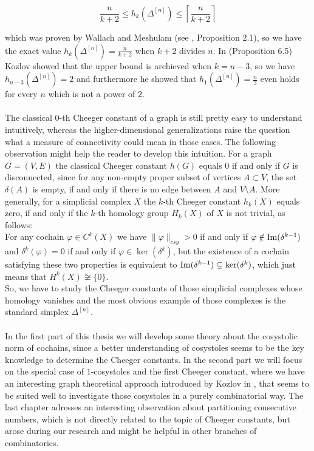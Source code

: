 \begin{equation}\label{equation1}
\frac{n}{k+2}\leq h_k(\Delta^{[n]})\leq\left\lceil\frac{n}{k+2}\right\rceil
\end{equation}

which was proven by Wallach and Meshulam (see \cite{4}, Proposition 2.1), so we have the exact value \(h_k(\Delta^{[n]})=\frac{n}{k+2}\) when \(k+2\) divides \(n\). In \cite{1} (Proposition 6.5) Kozlov showed that the upper bound is archieved when \(k=n-3\), so we have \(h_{n-3}(\Delta^{[n]})=2\) and furthermore he showed that \(h_1(\Delta^{[n]})=\frac{n}{3}\) even holds for every \(n\) which is not a power of \(2\).\\
\\
The classical \(0\)-th Cheeger constant of a graph is still pretty easy to understand intuitively, whereas the higher-dimensional generalizations raise the question what a measure of connectivity could mean in those cases. The following observation might help the reader to develop this intuition. For a graph \(G=(V,E)\) the classical Cheeger constant \(h(G)\) equals \(0\) if and only if \(G\) is disconnected, since for any non-empty proper subset of vertices \(A\subset V\), the set \(\delta(A)\) is empty, if and only if there is no edge between \(A\) and \(V\setminus A\). More generally, for a simplicial complex \(X\) the \(k\)-th Cheeger constant \(h_k(X)\) equals zero, if and only if the \(k\)-th homology group \(H_k(X)\) of \(X\) is not trivial, as follows:\\
For any cochain \(\varphi\in C^k(X)\) we have \(\|\varphi\|_{csy}>0\) if and only if \(\varphi\notin\mathrm{Im}(\delta^{k-1})\) and \(\delta^k(\varphi)=0\) if and only if \(\varphi\in\ker(\delta^k)\), but the existence of a cochain satisfying these two properties is equivalent to \(\mathrm{Im}(\delta^{k-1})\subsetneq\ker(\delta^k)\), which just means that \(H^k(X)\not\cong\{0\}\).\\
So, we have to study the Cheeger constants of those simplicial complexes whose homology vanishes and the most obvious example of those complexes is the standard simplex \(\Delta^{[n]}\).\\
\\
In the first part of this thesis we will develop some theory about the cosystolic norm of cochains, since a better understanding of cosystoles seems to be the key knowledge to determine the Cheeger constants. In the second part we will focus on the special case of \(1\)-cosystoles and the first Cheeger constant, where we have an interesting graph theoretical approach introduced by Kozlov in \cite{1}, that seems to be suited well to investigate those cosystoles in a purely combinatorial way. The last chapter adresses an interesting observation about partitioning consecutive numbers, which is not directly related to the topic of Cheeger constants, but arose during our research and might be helpful in other branches of combinatorics.

